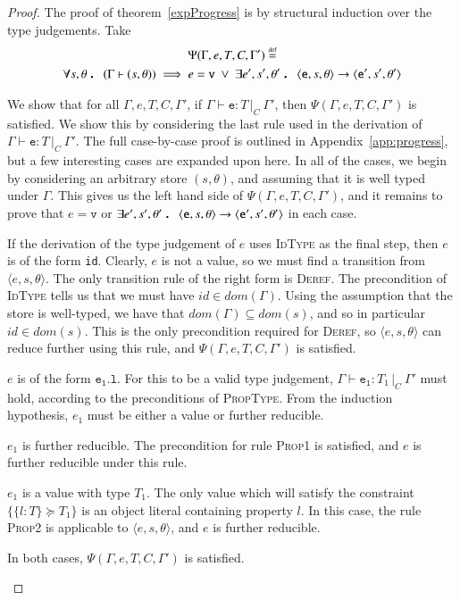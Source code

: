 \documentclass[12pt,a4paper,twoside,openright]{report}
\theoremstyle{definition}
\theoremstyle{dotless}
\newcommand{\typed}[2]{\Gamma{}\vdash\mathtt{#1}: #2\,|_C\:\Gamma'}
\newcommand{\transition}[6]{\langle{}\mathtt{#1},#2,#3\rangle{}\rightarrow{}\langle{}\mathtt{#4},#5,#6\rangle}
\newcommand{\indHypTwo}{\Psi(\Gamma, e, T, C, \Gamma')}
\newcommand\eqdef{\mathrel{\overset{\makebox[0pt]{\mbox{\normalfont\tiny def}}}{=}}}
\newcommand\qdot{\mathbin{\scalebox{1.5}{.}}\enspace}
\begin{document}
\begin{proof}
  The proof of theorem~\ref{expProgress} is by structural induction over the type judgements.
  Take
  \begin{multline*}
  	\indHypTwo \eqdef \\
  	\forall s,\theta\qdot (\Gamma \vdash (s,\theta))\implies e=\mathtt{v}\ \vee\ 
 	\exists e', s',\theta'\qdot \transition{e}{s}{\theta}{e'}{s'}{\theta'}
  \end{multline*}

  We show that for all $\Gamma, e, T, C, \Gamma'$, if $\typed{e}{T}$, then
  $\indHypTwo$ is satisfied. We show this by considering the last rule used in
  the derivation of $\typed{e}{T}$. The full case-by-case proof is outlined in
  Appendix~\ref{app:progress}, but a few interesting cases are expanded upon
  here. In all of the cases, we begin by considering an arbitrary store
  $(s,\theta)$, and assuming that it is well typed under $\Gamma$. This gives
  us the left hand side of $\indHypTwo$, and it remains to prove that
  $e=\mathtt{v}$ or $\exists e', s',\theta' \qdot
  \transition{e}{s}{\theta}{e'}{s'}{\theta'}$ in each case.

  \begin{case}[IdType]

	If the derivation of the type judgement of $e$ uses \textsc{IdType} as the
	final step, then $e$ is of the form \texttt{id}. Clearly, $e$ is not a
	value, so we must find a transition from $\langle e, s, \theta\rangle$. The
	only transition rule of the right form is \textsc{Deref}. The precondition
	of \textsc{IdType} tells us that we must have $id \in dom(\Gamma)$. Using
	the assumption that the store is well-typed, we have that
	$dom(\Gamma)\subseteq dom(s)$, and so in particular $id \in dom(s)$. This
	is the only precondition required for \textsc{Deref}, so $\langle e,
	s,\theta \rangle$ can reduce further using this rule, and $\indHypTwo$ is
	satisfied.
	
  \end{case}

  \begin{case}[PropType]\label{proptype}

	$e$ is of the form $\mathtt{e_1.l}$. For this to be a valid type
	judgement, $\typed{e_1}{T_1}$ must hold, according to the preconditions of
	\textsc{PropType}. From the induction hypothesis, $e_1$ must be either a
	value or further reducible.
	\begin{subcase}
	  $e_1$ is further reducible.
	  The precondition for rule \textsc{Prop1} is
	  satisfied, and $e$ is further reducible under this rule.
  	\end{subcase}
  	\begin{subcase}
  	  $e_1$ is a value with type $T_1$.
  	  The only value which will satisfy the constraint $\{\{l:T\}\succeq T_1\}$
	  is an object literal containing property $l$. In this case, the rule
	  \textsc{Prop2} is applicable to $\langle e, s, \theta\rangle$, and $e$ is
	  further reducible.
  	\end{subcase}
	In both cases, $\indHypTwo$ is satisfied.


\end{case}
\end{proof}
\end{document}
